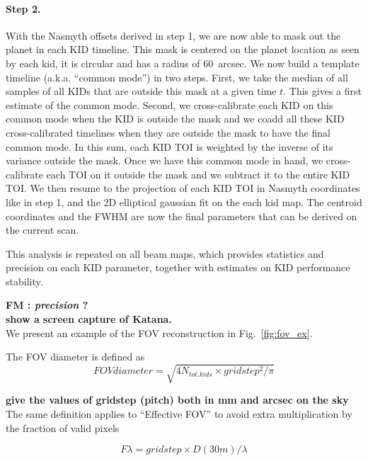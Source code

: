 \paragraph{Step 2.} With the Nasmyth offsets derived in step 1, we are now able to
mask out the planet in each KID timeline. This mask is centered on the planet
location as seen by each kid, it is circular and has a radius of 60~arcsec. We
now build a template timeline (a.k.a. ``common mode'') in two steps. First, we
take the median of all samples of all KIDs that are outside this mask at a given
time $t$. This gives a first estimate of the common mode. Second, we
cross-calibrate each KID on this common mode when the KID is outside the mask
and we coadd all these KID cross-calibrated timelines when they are outside the
mask to have the final common mode. In this sum, each KID TOI is weighted by the
inverse of its variance outside the mask. Once we have this common mode in hand,
we cross-calibrate each TOI on it outside the mask and we subtract it to the
entire KID TOI. We then resume to the projection of each KID TOI in Nasmyth
coordinates like in step 1, and the 2D elliptical gaussian fit on the each kid
map. The centroid coordinates and the FWHM are now the final parameters that can
be derived on the current scan.

This analysis is repeated on all beam maps, which provides statistics and
precision on each KID parameter, together with estimates on KID performance stability.



{\bf FM : {\it precision} ? }\\
{\bf show a screen capture of Katana.}\\

We present an example of the FOV reconstruction in Fig.~\ref{fig:fov_ex}.

The FOV diameter is defined as 
\begin{equation}
FOV diameter = \sqrt{4 N_{tot. kids} \times gridstep^2/\pi}
\end{equation}

{\bf give the values of gridstep (pitch) both in mm and arcsec on the sky}\\

The same definition applies to ``Effective FOV'' to avoid extra multiplication
by the fraction of valid pixels

\begin{equation}
F\lambda = gridstep\times D(30m)/\lambda
\end{equation}





